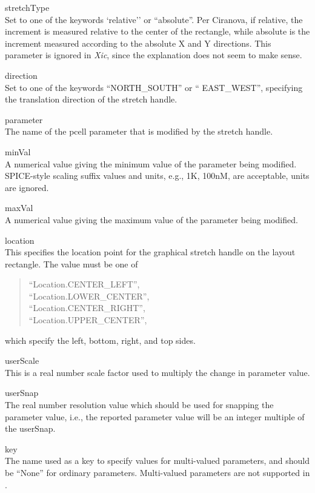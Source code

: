 \begin{description}
\begin{description}
\item{\vt stretchType}\\
Set to one of the keywords `{\vt relative}'' or ``{\vt absolute}''. 
Per Ciranova, if {\vt relative}, the increment is measured relative to
the center of the rectangle, while {\vt absolute} is the increment
measured according to the absolute X and Y directions.  This parameter
is ignored in {\it Xic}, since the explanation does not seem to make
sense.

\item{\vt direction}\\
Set to one of the keywords ``{\vt NORTH\_SOUTH}'' or ``{\vt
EAST\_WEST}'', specifying the translation direction of the stretch
handle.

\item{\vt parameter}\\
The name of the pcell parameter that is modified by the stretch
handle.

\item{\vt minVal}\\
A numerical value giving the minimum value of the parameter being
modified.  SPICE-style scaling suffix values and units, e.g., {\vt
1K}, {\vt 100nM}, are acceptable, units are ignored.

\item{\vt maxVal}\\
A numerical value giving the maximum value of the parameter being
modified.

\item{\vt location}\\
This specifies the location point for the graphical stretch handle
on the layout rectangle.  The value must be one of
\begin{quote}
``{\vt Location.CENTER\_LEFT}'',\\
``{\vt Location.LOWER\_CENTER}'',\\
``{\vt Location.CENTER\_RIGHT}'',\\
``{\vt Location.UPPER\_CENTER}'',\\
\end{quote}
which specify the left, bottom, right, and top sides.

\item{\vt userScale}\\
This is a real number scale factor used to multiply the change in
parameter value.

\item{\vt userSnap}\\
The real number resolution value which should be used for snapping the
parameter value, i.e., the reported parameter value will be an integer
multiple of the {\vt userSnap}.

\item{\vt key}\\
The name used as a key to specify values for multi-valued parameters,
and should be ``{\vt None}'' for ordinary parameters.  Multi-valued
parameters are not supported in {\Xic}.
\end{description}
\end{description}

